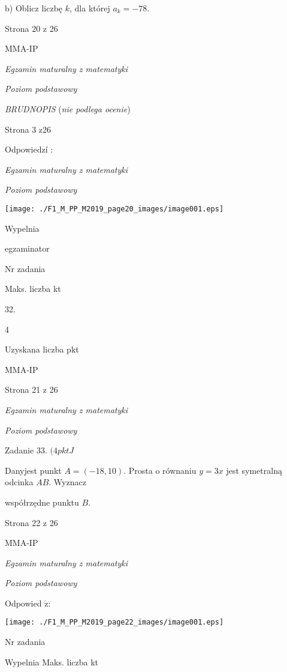 \documentclass[a4paper,12pt]{article}
\begin{document}
b) Oblicz liczbę $k$, dla której $a_{k}=-78.$

Strona 20 z 26

MMA-IP





{\it Egzamin maturalny z matematyki}

{\it Poziom podstawowy}

{\it BRUDNOPIS} ({\it nie podlega ocenie})

Strona 3 z26





Odpowiedzí :

{\it Egzamin maturalny z matematyki}

{\it Poziom podstawowy}
\begin{center}
\texttt{[image: ./F1\_M\_PP\_M2019\_page20\_images/image001.eps]}
\end{center}
Wypelnia

egzaminator

Nr zadania

Maks. liczba kt

32.

4

Uzyskana liczba pkt

MMA-IP

Strona 21 z 26





{\it Egzamin maturalny z matematyki}

{\it Poziom podstawowy}

Zadanie 33. $(4pktJ$

Danyjest punkt $A=(-18,10)$. Prosta o równaniu $y=3x$ jest symetralną odcinka $AB$. Wyznacz

współrzędne punktu $B.$

Strona 22 z 26

MMA-IP





{\it Egzamin maturalny z matematyki}

{\it Poziom podstawowy}

Odpowied $\acute{\mathrm{z}}$:
\begin{center}
\texttt{[image: ./F1\_M\_PP\_M2019\_page22\_images/image001.eps]}
\end{center}
Nr zadania

Wypelnia Maks. liczba kt
\end{document}
